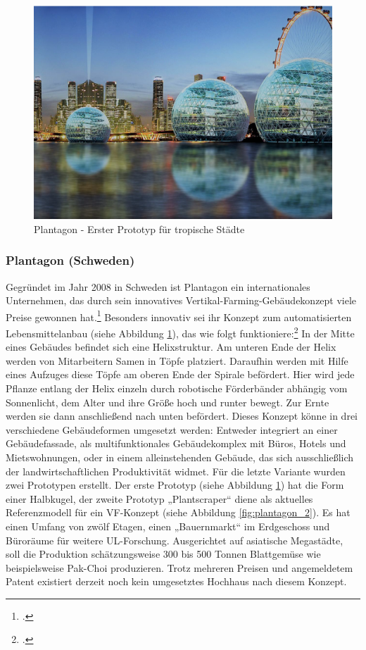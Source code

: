 \documentclass{scrartcl}
\begin{document}
\begin{figure}[htbp]
    \centering
    \includegraphics[width=12cm]{image_folder/plantagon.png}
  \caption{Plantagon - Erster Prototyp für tropische Städte}
  \label{fig:plantagon}
\end{figure} 

\subsubsection*{Plantagon (Schweden)}

Gegründet im Jahr 2008 in Schweden ist Plantagon ein internationales Unternehmen, das durch sein innovatives Vertikal-Farming-Gebäudekonzept viele Preise gewonnen hat.\footcite[Vgl.]{PlantagonAwardsPlantagon} Besonders innovativ sei ihr Konzept zum automatisierten Lebensmittelanbau (siehe Abbildung \ref{fig:plantagon}), das wie folgt funktioniere:\footcite[Vgl.][S.21f]{Al-Kodmany2018TheCity}  In der Mitte eines Gebäudes befindet sich eine Helixstruktur. Am unteren Ende der Helix werden von Mitarbeitern Samen in Töpfe platziert. Daraufhin werden mit Hilfe eines Aufzuges diese Töpfe am oberen Ende der Spirale befördert. Hier wird jede Pflanze entlang der Helix einzeln durch robotische Förderbänder abhängig vom Sonnenlicht, dem Alter und ihre Größe hoch und runter bewegt. Zur Ernte werden sie dann anschließend nach unten befördert. Dieses Konzept könne in drei verschiedene Gebäudeformen umgesetzt werden: Entweder integriert an einer Gebäudefassade, als multifunktionales Gebäudekomplex mit Büros, Hotels und Mietswohnungen, oder in einem alleinstehenden Gebäude, das sich ausschließlich der landwirtschaftlichen Produktivität widmet. Für die letzte Variante wurden zwei Prototypen erstellt. Der erste Prototyp (siehe Abbildung \ref{fig:plantagon}) hat die Form einer Halbkugel, der zweite Prototyp „Plantscraper“ diene als aktuelles Referenzmodell für ein VF-Konzept (siehe Abbildung \ref{fig:plantagon_2}). Es hat einen Umfang von zwölf Etagen, einen „Bauernmarkt“ im Erdgeschoss und Büroräume für weitere UL-Forschung. Ausgerichtet auf asiatische Megastädte, soll die Produktion schätzungsweise 300 bis 500 Tonnen Blattgemüse wie beispielsweise Pak-Choi produzieren. Trotz mehreren Preisen und angemeldetem Patent existiert derzeit noch kein umgesetztes Hochhaus nach diesem Konzept.
\end{document}

